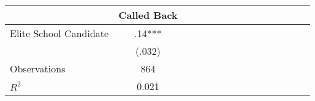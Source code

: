 \begin{tabular}{l*{14}{c}}
                    &\multicolumn{1}{c}{Called Back}\\
\hline
Elite School Candidate&         .14***\\
                    &      (.032)   \\
\hline
Observations        &         864   \\
\(R^{2}\)           &       0.021   \\
\end{tabular}
